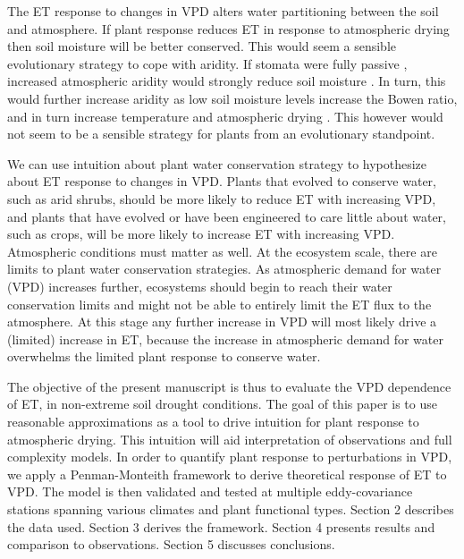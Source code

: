 \documentclass[draft,linenumbers]{agujournal}
\begin{document}
The ET response to changes in VPD alters water partitioning between the soil and atmosphere. If plant response reduces ET in response to atmospheric drying then soil moisture will be better conserved. This would seem a sensible evolutionary strategy to cope with aridity. If stomata were fully passive \citep [similar to soil pores, e.g. ][]{Or_2013}, increased atmospheric aridity would strongly reduce soil moisture \citep{Berg_2017}. In turn, this would further increase aridity as low soil moisture levels increase the Bowen ratio, and in turn increase temperature and atmospheric drying \citep[][]{Bouchet_1963, Morton_1965, Brutsaert_1999, Ozdogan_2006, Salvucci_2013, Gentine_2016, Berg_2016}. This however would not seem to be a sensible strategy for plants from an evolutionary standpoint.

We can use intuition about plant water conservation strategy to hypothesize about ET response to changes in VPD. Plants that evolved to conserve water, such as arid shrubs, should be more likely to reduce ET with increasing VPD, and plants that have evolved or have been engineered to care little about water, such as crops, will be more likely to increase ET with increasing VPD. Atmospheric conditions must matter as well. At the ecosystem scale, there are limits to plant water conservation strategies. As atmospheric demand for water (VPD) increases further, ecosystems should begin to reach their water conservation limits and might not be able to entirely limit the ET flux to the atmosphere. At this stage any further increase in VPD will most likely drive a (limited) increase in ET, because the increase in atmospheric demand for water overwhelms the limited plant response to conserve water.

The objective of the present manuscript is thus to evaluate the VPD dependence of ET, in non-extreme soil drought conditions. The goal of this paper is to use reasonable approximations as a tool to drive intuition for plant response to atmospheric drying. This intuition will aid interpretation of observations and full complexity models. In order to quantify plant response to perturbations in VPD, we apply a Penman-Monteith framework to derive theoretical response of ET to VPD. The model is then validated and tested at multiple eddy-covariance stations spanning various climates and plant functional types. Section 2 describes the data used. Section 3 derives the framework. Section 4 presents results and comparison to observations. Section 5 discusses conclusions. 
\end{document}
